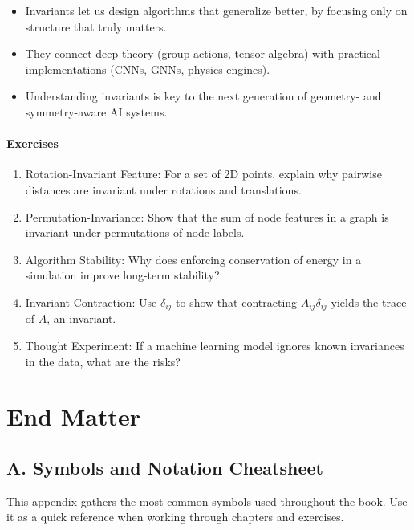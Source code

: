 \documentclass[
  letterpaper,
  DIV=11,
  numbers=noendperiod]{scrreprt}
\providecommand{\tightlist}{%
  \setlength{\itemsep}{0pt}\setlength{\parskip}{0pt}}
\begin{document}
\begin{itemize}
\tightlist
\item
  Invariants let us design algorithms that generalize better, by
  focusing only on structure that truly matters.
\item
  They connect deep theory (group actions, tensor algebra) with
  practical implementations (CNNs, GNNs, physics engines).
\item
  Understanding invariants is key to the next generation of geometry-
  and symmetry-aware AI systems.
\end{itemize}

\subsubsection{Exercises}\label{exercises-74}

\begin{enumerate}
\def\labelenumi{\arabic{enumi}.}
\item
  Rotation-Invariant Feature: For a set of 2D points, explain why
  pairwise distances are invariant under rotations and translations.
\item
  Permutation-Invariance: Show that the sum of node features in a graph
  is invariant under permutations of node labels.
\item
  Algorithm Stability: Why does enforcing conservation of energy in a
  simulation improve long-term stability?
\item
  Invariant Contraction: Use \(\delta_{ij}\) to show that contracting
  \(A_{ij}\delta_{ij}\) yields the trace of \(A\), an invariant.
\item
  Thought Experiment: If a machine learning model ignores known
  invariances in the data, what are the risks?
\end{enumerate}


\chapter{End Matter}\label{end-matter}

\section{A. Symbols and Notation
Cheatsheet}\label{a.-symbols-and-notation-cheatsheet}

This appendix gathers the most common symbols used throughout the book.
Use it as a quick reference when working through chapters and exercises.
\end{document}
